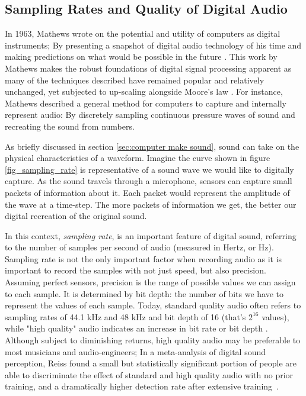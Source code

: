 \documentclass[\main/thesis.tex]{subfiles}
\begin{document}
\subsection{Sampling Rates and Quality of Digital Audio}
\label{sec_sampling_rates}
In 1963, Mathews wrote on the potential and utility of computers as digital instruments; By presenting a snapshot of digital audio technology of his time and making predictions on what would be possible in the future  \cite{mathews1963digital}. This work by Mathews makes the robust foundations of digital signal processing apparent as many of the techniques described have remained popular and relatively unchanged, yet subjected to up-scaling alongside Moore's law \cite{mack2011fifty,smith1991viewpoints}. For instance, Mathews described a general method for computers to capture and internally represent audio: By discretely sampling continuous pressure waves of sound and recreating the sound from numbers. 

As briefly discussed in section \ref{sec:computer make sound}, sound can take on the physical characteristics of a waveform. Imagine the curve shown in figure \ref{fig_sampling_rate} is representative of a sound wave we would like to digitally capture. As the sound travels through a microphone, sensors can capture small packets of information about it. Each packet would represent the amplitude of the wave at a time-step. The more packets of information we get, the better our digital recreation of the original sound.

In this context, \textit{sampling rate}, is an important feature of digital sound, referring to the number of samples per second of audio (measured in Hertz, or Hz). Sampling rate is not the only important factor when recording audio as it is important to record the samples with not just speed, but also precision. Assuming perfect sensors, precision is the range of possible values we can assign to each sample. It is determined by bit depth: the number of bits we have to represent the values of each sample.  Today, standard quality audio often refers to sampling rates of 44.1 kHz and 48 kHz and bit depth of 16 (that's $2^{16}$ values), while "high quality" audio indicates an increase in bit rate or bit depth \cite{reiss2016meta}. Although subject to diminishing returns, high quality audio may be preferable to most musicians and audio-engineers; In a meta-analysis of digital sound perception, Reiss found a small but statistically significant portion of people are able to discriminate the effect of standard and high quality audio with no prior training, and a dramatically higher detection rate after extensive training~\cite{reiss2016meta}. 
\end{document}
